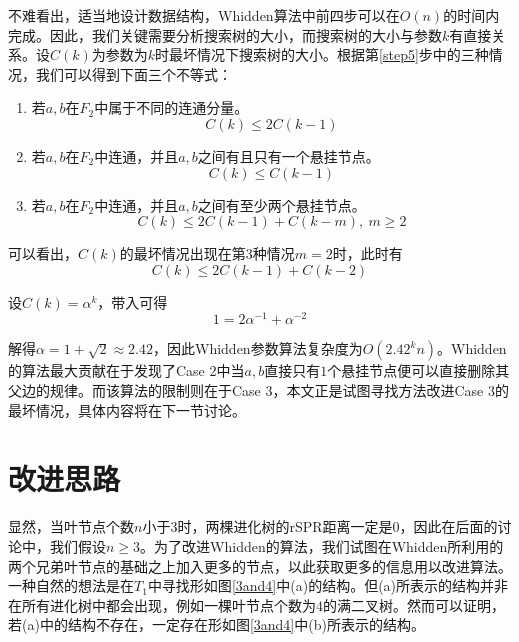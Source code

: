不难看出，适当地设计数据结构，Whidden算法中前四步可以在$O(n)$的时间内完成。因此，我们关键需要分析搜索树的大小，而搜索树的大小与参数$k$有直接关系。设$C(k)$为参数为$k$时最坏情况下搜索树的大小。根据第\ref{step5}步中的三种情况，我们可以得到下面三个不等式：
\begin{enumerate}
	\item 若$a,b$在$F_2$中属于不同的连通分量。
	\begin{equation*}
		C(k) \le 2C(k-1)
	\end{equation*}
	\item 若$a,b$在$F_2$中连通，并且$a,b$之间有且只有一个悬挂节点。
	\begin{equation*}
		C(k) \le C(k-1)
	\end{equation*}
	\item \label{case3_an}若$a,b$在$F_2$中连通，并且$a,b$之间有至少两个悬挂节点。
	\begin{equation*}
		C(k) \le 2C(k-1) + C(k-m),~m \ge 2
	\end{equation*}
\end{enumerate}

可以看出，$C(k)$的最坏情况出现在第3种情况$m = 2$时，此时有
\begin{equation*}
C(k) \le 2C(k-1) + C(k-2)
\end{equation*}

设$C(k)=\alpha ^ k$，带入可得
\begin{equation*}
 1 = 2 \alpha ^ {-1} + \alpha ^ {-2}
\end{equation*}

解得$\alpha = 1 + \sqrt{2} \approx 2.42$，因此Whidden参数算法复杂度为$O(2.42^kn)$。Whidden的算法最大贡献在于发现了Case 2中当$a,b$直接只有$1$个悬挂节点便可以直接删除其父边的规律。而该算法的限制则在于Case 3，本文正是试图寻找方法改进Case 3的最坏情况，具体内容将在下一节讨论。

\section{改进思路}
显然，当叶节点个数$n$小于$3$时，两棵进化树的rSPR距离一定是$0$，因此在后面的讨论中，我们假设$n \ge 3$。为了改进Whidden的算法，我们试图在Whidden所利用的两个兄弟叶节点的基础之上加入更多的节点，以此获取更多的信息用以改进算法。一种自然的想法是在$T_1$中寻找形如图\ref{3and4}中(a)的结构。但(a)所表示的结构并非在所有进化树中都会出现，例如一棵叶节点个数为$4$的满二叉树。然而可以证明，若(a)中的结构不存在，一定存在形如图\ref{3and4}中(b)所表示的结构。
\clearpage
{}


